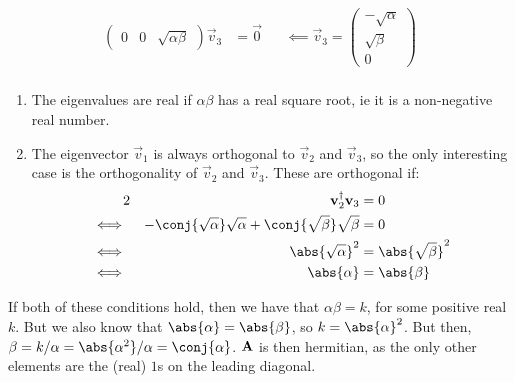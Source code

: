 \documentclass[fleqn,a4paper,11pt]{article}
\begin{document}
\begin{enumerate}[label=\textbf{\arabic*.}]
\begin{alignat*}
\begin{pmatrix}
      0 & 0 & \sqrt{\alpha \beta}
     \end{pmatrix}
     \vec v_3 &= \vec 0
     &&\impliedby \vec v_3 =
     \begin{pmatrix} -\sqrt \alpha \\ \sqrt \beta \\ 0 \end{pmatrix} \\
   \end{alignat*}
   \begin{enumerate}[label=(\roman*)]
    \item
     The eigenvalues are real if
     \(\alpha \beta\) has a real square root, ie it is a non-negative real
     number.
    \item
     The eigenvector \(\vec v_1\) is always orthogonal to
     \(\vec v_2\) and \(\vec v_3\), so the only interesting case is the
     orthogonality of \(\vec v_2\) and \(\vec v_3\). These are orthogonal if:
     \begin{alignat*}2
      && \herm{\vec v_2} \vec v_3 &= 0 \\
      \iff{}&&
      - \conj{\sqrt \alpha} \sqrt \alpha
      + \conj{\sqrt \beta} \sqrt \beta &= 0 \\
      \iff{}&&
      \abs{\sqrt \alpha}^2 &= \abs{\sqrt \beta}^2 \\
      \iff{}&&
      \abs{\alpha} &= \abs{\beta}
     \end{alignat*}
   \end{enumerate}
   If both of these conditions hold, then we have that
   \(\alpha \beta = k\), for some positive real \(k\). But we also know that
   \(\abs{\alpha} = \abs{\beta}\), so \(k = \abs{\alpha}^2\). But then,
   \(\beta = k / \alpha = \abs{\alpha^2} / \alpha = \conj{\alpha}\).
   \(\mathbf{A}\) is then hermitian, as the only other elements are the (real)
   \(1\)s on the leading diagonal.


\end{enumerate}
\end{document}
